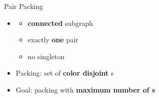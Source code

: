 \begin{frame}{Pair Packing}
\begin{minipage}[t]{0.48\linewidth}
\begin{itemize}

\item<1->\alert{\Pack{}} 
	\begin{itemize}
	\item<2->
	\textbf{connected} subgraph
	\item<3->
	exactly \textbf{one} pair
	\item<4->
	no singleton
	\end{itemize}

\item<6->
\alert{Packing}: set of \textbf{color disjoint} \pack{}s

\item<7->
Goal: packing with \textbf{maximum number of \pack{}s} 


\end{itemize}
\end{minipage}
\hfill
\begin{minipage}[t]{0.48\linewidth}
\end{minipage}
\end{frame}